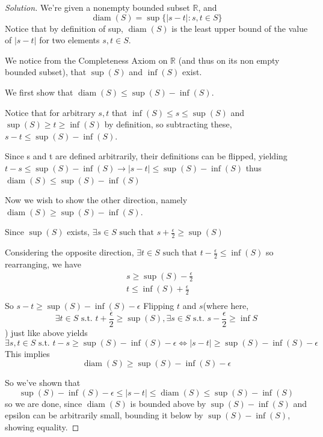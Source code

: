 \documentclass[11pt]{article}
\newcommand{\1}{\mathbf{1}}
\DeclareMathOperator{\diam}{diam}
\theoremstyle{definition}
\newenvironment{solution}{\begin{proof}[Solution]}{\end{proof}}
\begin{document}
\begin{solution}
    We're given a nonempty bounded subset $\mathbb{R}$, and $$\diam(S) = { \sup\{|s-t| :
    s, t \in S\}}$$
Notice that by definition of sup, $\diam(S)$ is the least upper bound of the value of
$|s-t|$ for two elements $s, t\in S$.
\par We notice from the Completeness Axiom on $\mathbb{R}$ (and thus on its non empty bounded
subset), that $\sup(S)$ and $\inf(S)$ exist. 
\par We first show that $\diam(S) \le \sup(S) - \inf(S).$ \par Notice that for arbitrary $s, t$ that $\inf(S) \le s \le \sup(S)$ and $\sup(S) \ge t
\ge \inf(S)$ by definition, so subtracting these, $s - t \le \sup(S) - \inf(S)$.
\par Since s and t are defined arbitrarily, their definitions can be flipped, yielding $t - s
\le \sup(S) - \inf(S) \rightarrow |s - t| \le \sup(S) - \inf(S)$
thus $\diam(S) \le \sup(S) - \inf(S)$

Now we wish to show the other direction, namely $\diam(S) \ge \sup(S) - \inf(S)$.
\par Since $\sup(S)$ exists, $\exists s \in S \text{ such that } s + \frac{\epsilon}{2} \ge \sup(S)$
\par Considering the opposite direction, $\exists t \in S \text{ such that } t - \frac{\epsilon}{2}
\le \inf(S)$
so rearranging, we have
\begin{align}
    & s \ge \sup(S) - \frac{\epsilon}{2}\\
    & t \le \inf(S) + \frac{\epsilon}{2}\\
\end{align}
So $ s - t \ge \sup(S) - \inf(S) - \epsilon$
Flipping $t$ and $s$(where here, $$\exists t \in S \text{ s.t. } t + \frac{\epsilon}{2} \ge \sup(S), \exists s \in S \text{ s.t. } s - \frac{\epsilon}{2} \ge \inf S$$) just like above yields $$\exists s, t \in S \text{ s.t. } t - s\ge \sup(S) - \inf(S) -
\epsilon \iff |s - t| \ge \sup(S) - \inf(S) - \epsilon$$
This implies $$\diam(S) \ge \sup(S) - \inf(S) - \epsilon$$
\par So we've shown that $$\sup(S) - \inf(S) - \epsilon \le |s - t| \le \diam(S) \le \sup(S) - \inf(S)$$  so we are done, since $\diam(S)$ is bounded above by $\sup(S) - \inf(S)$ and epsilon can be arbitrarily small, bounding it below by $\sup(S) - \inf(S)$, showing equality.
\end{solution}
\end{document}
